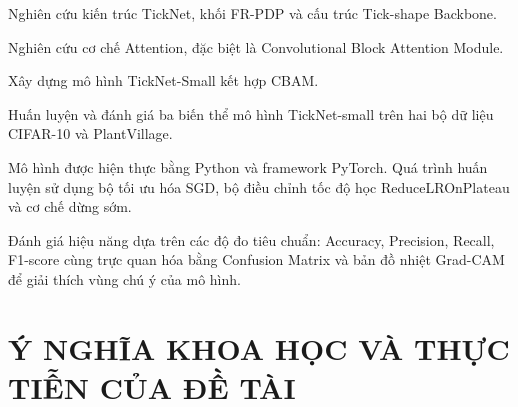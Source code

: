 \documentclass[
  12pt,
  a4paper,
]{report}
\begin{document}
Nghiên cứu kiến trúc TickNet, khối FR-PDP và cấu trúc Tick-shape
Backbone.

Nghiên cứu cơ chế Attention, đặc biệt là Convolutional Block Attention
Module.

Xây dựng mô hình TickNet-Small kết hợp CBAM.

Huấn luyện và đánh giá ba biến thể mô hình TickNet-small trên hai bộ dữ
liệu CIFAR-10 và PlantVillage.

Mô hình được hiện thực bằng Python và framework PyTorch. Quá trình huấn
luyện sử dụng bộ tối ưu hóa SGD, bộ điều chỉnh tốc độ học
ReduceLROnPlateau và cơ chế dừng sớm.

Đánh giá hiệu năng dựa trên các độ đo tiêu chuẩn: Accuracy, Precision,
Recall, F1-score cùng trực quan hóa bằng Confusion Matrix và bản đồ
nhiệt Grad-CAM để giải thích vùng chú ý của mô hình.

\section{Ý NGHĨA KHOA HỌC VÀ THỰC TIỄN CỦA ĐỀ
TÀI}\label{uxfd-nghux129a-khoa-hux1ecdc-vuxe0-thux1ef1c-tiux1ec5n-cux1ee7a-ux111ux1ec1-tuxe0i}
\end{document}
